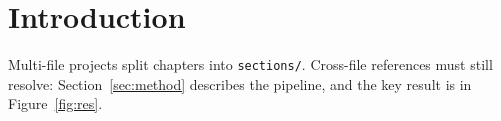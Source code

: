\section{Introduction}
Multi-file projects split chapters into \texttt{sections/}. Cross-file references must still resolve:
Section~\ref{sec:method} describes the pipeline, and the key result is in Figure~\ref{fig:res}.

